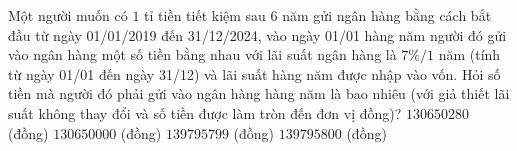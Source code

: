 \begin{ex}%
    Một người muốn có $ 1$ tỉ tiền tiết kiệm sau $ 6$ năm gửi ngân hàng bằng cách bắt đầu từ ngày 01/01/2019 đến 31/12/2024, vào ngày 01/01 hàng năm người đó gửi vào ngân hàng một số tiền bằng nhau với lãi suất ngân hàng là $ 7\%/1$ năm (tính từ ngày 01/01 đến ngày 31/12) và lãi suất hàng năm được nhập vào vốn. Hỏi số tiền mà người đó phải gửi vào ngân hàng hàng năm là bao nhiêu (với giả thiết lãi suất không thay đổi và số tiền được làm tròn đến đơn vị đồng)?
    \choice
    {\True $ 130650280$ (đồng)}
    {$ 130650000$ (đồng)}
    {$ 139795799$ (đồng)}
    {$ 139795800$ (đồng)}
\end{ex}
